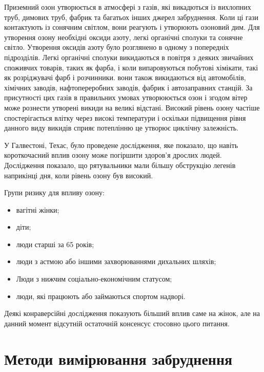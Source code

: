 Приземний озон утворюється в атмосфері з газів, які викадються із вихлопних труб, димових труб, 
фабрик та багатьох інших джерел забруднення. Коли ці гази контактують із сонячним світлом, 
вони реагують і утворюють озоновий дим. Для утворення озону необхідні оксиди азоту, легкі органічні сполуки та сонячне світло. Утворення оксидів азоту було розглянено в одному з 
попередніх підрозділів. Легкі органічні сполуки викидаються в повітря з деяких звичайних 
споживчих товарів, таких як фарба, і коли випаровуються побутові хімікати, такі як розріджувачі 
фарб і розчинники. вони також викидаються від автомобілів, хімічних заводів, нафтопереробних 
заводів, фабрик і автозаправних станцій. За присутності цих газів в правильних умовах 
утворююється озон і згодом вітер може рознести утворені викиди на великі відстані. 
Високий рівень озону частіше спостерігається влітку через високі температури і оскільки 
підвищення рівня данного виду викидів сприяє потеплінню це утворює циклічну залежність.

У Галвестоні, Техас, було проведене дослідження, яке показало, що навіть короткочасний вплив 
озону може погіршити здоров'я дрослих людей. Дослідження показало, що рятувальники мали більшу 
обструкцію легенів наприкінці дня, коли рівень озону був високий.

Групи ризику для впливу озону:

\begin{itemize}
    \item вагітні жінки;
    \item діти;
    \item люди старші за 65 років;
    \item люди з астмою або іншими захворюваннями дихальних шляхів;
    \item Люди з нижчим соціально-економічним статусом;
    \item люди, які працюють або займаються спортом надворі.
\end{itemize}

Деякі конраверсійні дослідження показують більший вплив саме на жінок, але на данний момент 
відсутній остаточній консенсус стосовно цього питання.



\section{Методи вимірювання забруднення}
